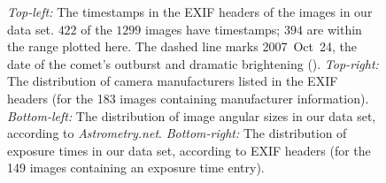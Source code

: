 \documentclass[12pt,preprint]{aastex}
\newcommand{\project}[1]{\textsl{#1}}
\newcommand{\An}{\project{Astrometry.net}}
\begin{document}
\begin{figure}
\begin{center}
\end{center}
\caption[meta-data]{\textsl{Top-left:} The timestamps in the EXIF
  headers of the images in our data set.  $422$ of the $1299$ images
  have timestamps; $394$ are within the range plotted here.
  The dashed line marks 2007~Oct~24, the date of the
  comet's outburst and dramatic brightening (\citealt{outburst}).
  \textsl{Top-right:} The distribution of camera manufacturers
  listed in the EXIF headers (for the 183 images containing manufacturer
  information).
  \textsl{Bottom-left:}  The distribution of image angular sizes in our
  data set, according to \An.
  \textsl{Bottom-right:} The distribution of exposure times in our
  data set, according to EXIF headers (for the 149 images containing
  an exposure time entry).\label{fig:imgstats}}
\end{figure}

\end{document}
